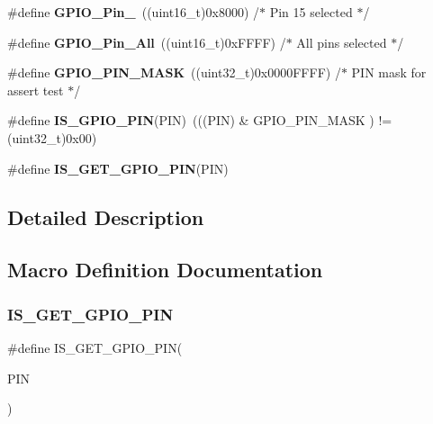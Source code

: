 \begin{DoxyCompactItemize}
\item 
\mbox{\label{group___g_p_i_o__pins__define_gae686a9fc47cf3e420e5db0784210711d}} 
\#define {\bfseries G\+P\+I\+O\+\_\+\+Pin\+\_}~((uint16\+\_\+t)0x8000)  /$\ast$ Pin 15 selected $\ast$/
\item 
\mbox{\label{group___g_p_i_o__pins__define_gaba3e915ddca17a1211edc07b7fd97e8b}} 
\#define {\bfseries G\+P\+I\+O\+\_\+\+Pin\+\_\+\+All}~((uint16\+\_\+t)0x\+F\+F\+F\+F)  /$\ast$ All pins selected $\ast$/
\item 
\mbox{\label{group___g_p_i_o__pins__define_gab135afee57cdef0f647ab153f88b6d2f}} 
\#define {\bfseries G\+P\+I\+O\+\_\+\+P\+I\+N\+\_\+\+M\+A\+SK}~((uint32\+\_\+t)0x0000\+F\+F\+F\+F) /$\ast$ P\+I\+N mask for assert test $\ast$/
\item 
\mbox{\label{group___g_p_i_o__pins__define_gad6ec74e33360395535ad5d91ba6d4781}} 
\#define {\bfseries I\+S\+\_\+\+G\+P\+I\+O\+\_\+\+P\+IN}(P\+IN)~(((P\+IN) \& G\+P\+I\+O\+\_\+\+P\+I\+N\+\_\+\+M\+A\+SK ) != (uint32\+\_\+t)0x00)
\item 
\#define {\bfseries I\+S\+\_\+\+G\+E\+T\+\_\+\+G\+P\+I\+O\+\_\+\+P\+IN}(P\+IN)
\end{DoxyCompactItemize}


\subsection{Detailed Description}


\subsection{Macro Definition Documentation}
\mbox{\label{group___g_p_i_o__pins__define_gaddf7154b7f30b7c0a70f3aeaff5ddffc}} 
\subsubsection{\texorpdfstring{I\+S\+\_\+\+G\+E\+T\+\_\+\+G\+P\+I\+O\+\_\+\+P\+IN}{IS\_GET\_GPIO\_PIN}}
{\footnotesize\ttfamily \#define I\+S\+\_\+\+G\+E\+T\+\_\+\+G\+P\+I\+O\+\_\+\+P\+IN(\begin{DoxyParamCaption}\item[{}]{P\+IN }\end{DoxyParamCaption})}

